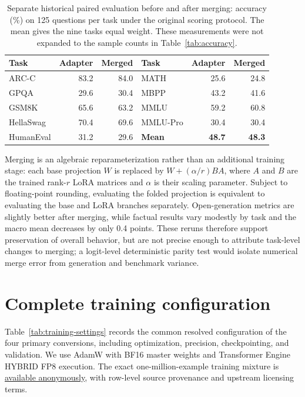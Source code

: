 \documentclass{article}
\begin{document}
\begin{table}[h]
\caption{Separate historical paired evaluation before and after merging: accuracy (\%) on 125 questions per task under the original scoring protocol. The mean gives the nine tasks equal weight. These measurements were not expanded to the sample counts in Table~\ref{tab:accuracy}.}
\label{tab:merge-benchmarks}
\centering
\small
\begin{tabular}{lrr@{\qquad}lrr}
\toprule
Task & Adapter & Merged & Task & Adapter & Merged \\
\midrule
ARC-C      & 83.2 & 84.0 & MATH     & 25.6 & 24.8 \\
GPQA       & 29.6 & 30.4 & MBPP     & 43.2 & 41.6 \\
GSM8K      & 65.6 & 63.2 & MMLU     & 59.2 & 60.8 \\
HellaSwag  & 70.4 & 69.6 & MMLU-Pro & 30.4 & 30.4 \\
HumanEval  & 31.2 & 29.6 & \textbf{Mean} & \textbf{48.7} & \textbf{48.3} \\
\bottomrule
\end{tabular}
\end{table}

Merging is an algebraic reparameterization rather than an additional training stage: each base projection $W$ is replaced by $W+(\alpha/r)BA$, where $A$ and $B$ are the trained rank-$r$ LoRA matrices and $\alpha$ is their scaling parameter. Subject to floating-point rounding, evaluating the folded projection is equivalent to evaluating the base and LoRA branches separately. Open-generation metrics are slightly better after merging, while factual results vary modestly by task and the macro mean decreases by only 0.4 points. These reruns therefore support preservation of overall behavior, but are not precise enough to attribute task-level changes to merging; a logit-level deterministic parity test would isolate numerical merge error from generation and benchmark variance.

\section{Complete training configuration}
\label{app:training-settings}

Table~\ref{tab:training-settings} records the common resolved configuration of the four primary conversions, including optimization, precision, checkpointing, and validation. We use AdamW with BF16 master weights and Transformer Engine HYBRID FP8 execution. The exact one-million-example training mixture is \href{https://huggingface.co/datasets/Dovelove/BYOD-training-1m-256}{available anonymously}, with row-level source provenance and upstream licensing terms.
\end{document}
